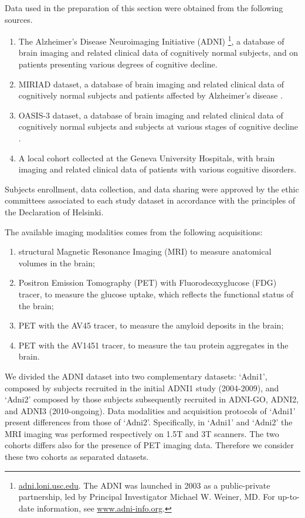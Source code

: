 Data used in the preparation of this section were obtained from the following sources.
\begin{enumerate}
%
\item The Alzheimer's Disease Neuroimaging Initiative (ADNI)
\footnote{
\href{http://adni.loni.usc.edu}{adni.loni.usc.edu}.
The ADNI was launched in 2003 as a public-private partnership, led by Principal Investigator Michael W. Weiner, MD. For up-to-date information, see \href{www.adni-info.org}{www.adni-info.org}.
},
a database of brain imaging and related clinical data of cognitively normal subjects, and on patients presenting various degrees of cognitive decline.
%
\item MIRIAD dataset, a database of brain imaging and related clinical data of cognitively normal subjects and patients affected by Alzheimer's disease \citep{Miriad}.
%
\item OASIS-3 dataset, a database of brain imaging and related clinical data of cognitively normal subjects and subjects at various stages of cognitive decline \citep{oasis3}.
%
\item A local cohort collected at the Geneva University Hospitals, with brain imaging and related clinical data of patients with various cognitive disorders.
\end{enumerate}
Subjects enrollment, data collection, and data sharing were approved by the ethic committees associated to each study dataset in accordance with the principles of the Declaration of Helsinki.

The available imaging modalities comes from the following acquisitions:
%
\begin{enumerate}
\item structural Magnetic Resonance Imaging (MRI) to measure anatomical volumes in the brain;
%
\item Positron Emission Tomography (PET) with Fluorodeoxyglucose (FDG) tracer, to measure the glucose uptake, which reflects the functional status of the brain;
\item PET with the AV45 tracer, to measure the amyloid deposits in the brain;
\item PET with the AV1451 tracer, to measure the tau protein aggregates in the brain.
\end{enumerate}
%

We divided the ADNI dataset into two complementary datasets:
`Adni1', composed by subjects recruited in the initial ADNI1 study (2004-2009),
and `Adni2' composed by those subjects subsequently recruited in ADNI-GO, ADNI2, and ADNI3 (2010-ongoing).
Data modalities and acquisition protocols of `Adni1' present differences from those of `Adni2'.
Specifically, in `Adni1' and `Adni2' the MRI imaging was performed respectively on 1.5T and 3T scanners.
The two cohorts differs also for the presence of PET imaging data.
Therefore we consider these two cohorts as separated datasets.

